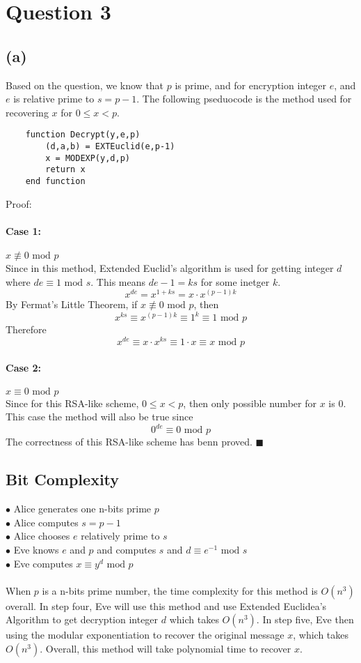 \documentclass{article}
\begin{document}
\section*{Question 3}
    \subsection*{(a)}
Based on the question, we know that $p$ is prime, and for encryption
integer $e$, and $e$ is relative prime to $s = p-1$. The following pseduocode is the method used for recovering $x$ for $0 \leq x < p$.
\begin{verbatim}
    function Decrypt(y,e,p)
        (d,a,b) = EXTEuclid(e,p-1)
        x = MODEXP(y,d,p)
        return x
    end function
\end{verbatim}
Proof: 
\paragraph{Case 1: } $x \not\equiv 0 \mbox{ mod } p$ \\
Since in this method, Extended Euclid's algorithm is used for getting integer $d$ where $de \equiv 1 \mbox{ mod } s$.
This means $de - 1 = ks$ for some inetger $k$.
$$x^{de} = x^{1+ks} = x\cdot x^{(p-1)k}$$
By Fermat's Little Theorem, if $x \not\equiv 0 \mbox{ mod } p$, then
$$x^{ks} \equiv x^{(p-1)k} \equiv 1^{k} \equiv 1 \mbox{ mod } p$$
Therefore 
$$x^{de} \equiv x\cdot x^{ks} \equiv 1\cdot x \equiv x \mbox{ mod } p $$

\paragraph{Case 2: }  $x \equiv 0 \mbox{ mod } p$ \\
Since for this RSA-like scheme, $ 0 \leq x < p$, then only possible number for $x$ is $0$.
This case the method will also be true since
$$0^{de} \equiv 0 \mbox{ mod } p$$
The correctness of this RSA-like scheme has benn proved. $\blacksquare$

\subsection*{Bit Complexity}

$\bullet$ Alice generates one n-bits prime $p$\\
$\bullet$ Alice computes $s = p-1$\\
$\bullet$ Alice chooses $e$  relatively prime to $s$\\
$\bullet$ Eve knows $e$ and $p$ and computes $s$ and $d \equiv e^{-1} \mbox{ mod } s$ \\
$\bullet$ Eve computes $x\equiv y^d \mbox{ mod } p$\\
\\
When $p$ is a n-bits prime number, the time complexity for this method is $O(n^3)$ overall. In step four, Eve
will use this method and use Extended Euclidea's Algorithm to get decryption integer $d$ which takes $O(n^3)$.
In step five, Eve then using the modular exponentiation to recover the original message $x$, which takes $O(n^3)$.
Overall, this method will take polynomial time to recover $x$.
\end{document}
